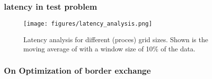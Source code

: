 \subsubsection{latency in test problem}
\begin{figure}[H]
    \centering
    \texttt{[image: figures/latency\_analysis.png]}
    \caption{Latency analysis for different (proces) grid sizes. Shown is the moving average of with a window size of 10\% of the data.}
    \label{fig:latency_analysis}
\end{figure}

\subsubsection{On Optimization of border exchange} 